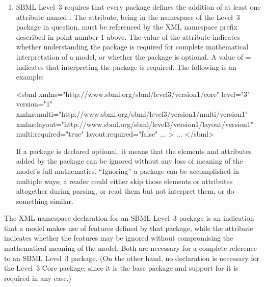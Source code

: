 \begin{enumerate}
\item SBML Level~3 requires that every package defines the
  addition of at least one attribute named .  The
  attribute, being in the namespace of the Level~3 package in
  question, must be referenced by the XML namespace prefix
  described in point number 1 above.  The value of the
   attribute indicates whether understanding the
  package is required for complete mathematical interpretation of
  a model, or whether the package is optional.  A value of
  = indicates that interpreting the
  package is required.  The following is an example:
  \begin{example}
<sbml xmlns="http://www.sbml.org/sbml/level3/version1/core" level="3" version="1"
      xmlns:multi="http://www.sbml.org/sbml/level3/version1/multi/version1"
      xmlns:layout="http://www.sbml.org/sbml/level3/version1/layout/version1"
      multi:required="true"
      layout:required="false" ... >
  ...
</sbml>   \end{example}
  If a package is declared optional, it means that the elements and
  attributes added by the package can be ignored without any loss of
  meaning of the model's full mathematics.  ``Ignoring'' a package
  can be accomplished in multiple ways; a reader could either skip
  those elements or attributes altogether during parsing, or read
  them but not interpret them, or do something similar.

\end{enumerate}

The XML namespace declaration for an SBML Level~3 package is an
indication that a model makes use of features defined by that
package, while the  attribute indicates whether
the features may be ignored without compromising the mathematical
meaning of the model.  Both are necessary for a complete reference
to an SBML Level~3 package.  (On the other hand, no declaration is
necessary for the Level~3 Core package, since it is the base
package and support for it is required in any case.)



